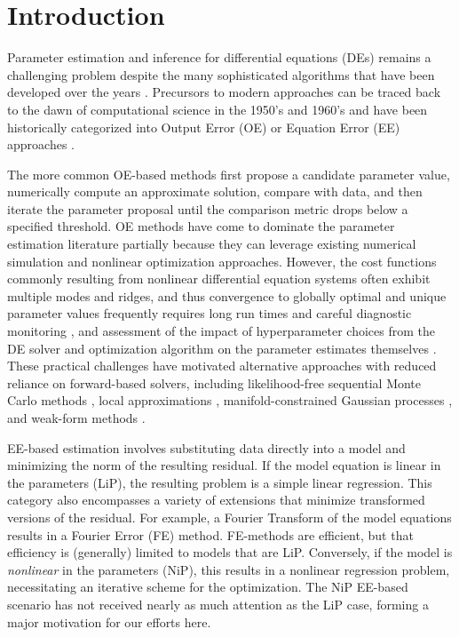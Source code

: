 \section{Introduction}

Parameter estimation and inference for differential equations (DEs) remains a challenging problem despite the many sophisticated algorithms that have been developed over the years \citep{McGoffMukherjeePillai2015StatSurv}. Precursors to modern approaches can be traced back to the dawn of computational science in the 1950's and 1960's \citep{Greenberg1951NACATN2340} and have been historically categorized into Output Error (OE) or Equation Error (EE) approaches \citep{Ljung1999,Ljung2017WileyEncyclopediaofElectricalandElectronicsEngineering}.
 
The more common OE-based methods first propose a candidate parameter value, numerically compute an approximate solution, compare with data, and then iterate the parameter proposal until the comparison metric drops below a specified threshold. OE methods have come to dominate the parameter estimation literature partially because they can leverage existing numerical simulation and nonlinear optimization approaches. However, the cost functions commonly resulting from nonlinear differential equation systems often exhibit multiple modes and ridges, and thus convergence to globally optimal and unique parameter values frequently requires long run times and careful diagnostic monitoring \citep{DukicLopesPolson2012JAmStatAssoc,KennedyDukicDwyer2014AmNat,RamsayHookerCampbellEtAl2007JRStatSocSerBStatMethodol}, and assessment of the  impact of hyperparameter choices from the DE solver and optimization algorithm  on the parameter estimates themselves \citep{NardiniBortz2019InverseProbl}. These  practical challenges have motivated alternative approaches with reduced reliance on forward-based solvers, including likelihood-free sequential Monte Carlo methods \citep{ToniWelchStrelkowaEtAl2009JRSocInterface}, local approximations \citep{ConradMarzoukPillaiEtAl2016JAmStatAssoc}, manifold-constrained Gaussian processes \citep{WongYangKou2024JStatSoft,YangWongKou2021ProcNatlAcadSciUSA}, and weak-form methods \citep{BortzMessengerDukic2023BullMathBiol,BrunelClairondAlche-Buc2014JAmStatAssoc,HallMa2014JRStatSocB}. 
 
EE-based estimation involves substituting data directly into a model and minimizing the norm of the resulting residual. If the model equation is linear in the parameters (LiP), the resulting problem is a simple linear regression. This category also encompasses a variety of extensions that minimize transformed versions of the residual. For example, a Fourier Transform of the model equations results in a Fourier Error (FE) method. FE-methods are efficient, but that efficiency is (generally) limited to models that are LiP. Conversely, if the model is \emph{nonlinear} in the parameters (NiP), this results in a nonlinear regression problem, necessitating an iterative scheme for the optimization. The NiP EE-based scenario has not received nearly as much attention as the LiP case, forming a major motivation for our efforts here.

